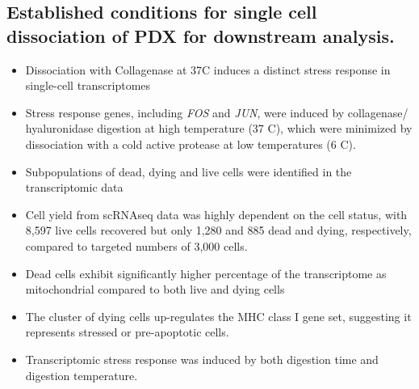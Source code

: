  \subsection{Established conditions for single cell dissociation of PDX for downstream analysis.}
\begin{itemize} 
 
 \item Dissociation with Collagenase at 37\textdegree C induces a distinct stress response in single-cell transcriptomes
  \item Stress response genes, including \textit{FOS} and \textit{JUN}, were induced by collagenase/ hyaluronidase digestion at high temperature (37 \textdegree C), which were minimized by dissociation with a cold active protease at low temperatures (6 \textdegree C).
 \item  Subpopulations of dead, dying and live cells were identified in the transcriptomic data
  \item Cell yield from scRNAseq data was highly dependent on the cell status, with 8,597 live cells recovered but only 1,280 and 885 dead and dying, respectively, compared to targeted numbers of 3,000 cells.
   \item Dead cells exhibit significantly higher percentage of the transcriptome as mitochondrial compared to both live and dying cells
    \item The cluster of dying cells up-regulates the MHC class I gene set, suggesting it represents stressed or pre-apoptotic cells.
    \item Transcriptomic stress response was induced by both digestion time and digestion temperature.


\end{itemize}


 
